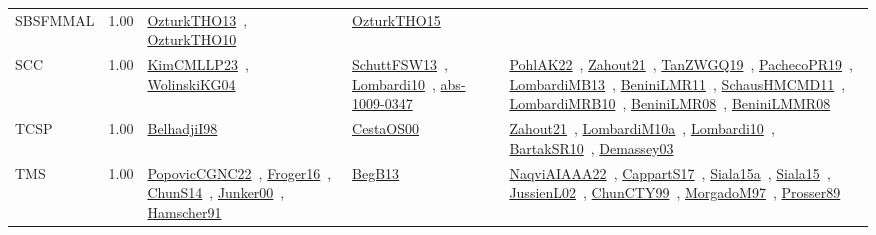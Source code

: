 {\begin{longtable}{p{3cm}r>{\raggedright\arraybackslash}p{6cm}>{\raggedright\arraybackslash}p{6cm}>{\raggedright\arraybackslash}p{8cm}}
\index{SBSFMMAL}\index{Classification!SBSFMMAL}SBSFMMAL &  1.00 & \href{../works/OzturkTHO13.pdf}{OzturkTHO13}~\cite{OzturkTHO13}, \href{../works/OzturkTHO10.pdf}{OzturkTHO10}~\cite{OzturkTHO10} & \href{../works/OzturkTHO15.pdf}{OzturkTHO15}~\cite{OzturkTHO15} & \\
\index{SCC}\index{Classification!SCC}SCC &  1.00 & \href{../works/KimCMLLP23.pdf}{KimCMLLP23}~\cite{KimCMLLP23}, \href{../works/WolinskiKG04.pdf}{WolinskiKG04}~\cite{WolinskiKG04} & \href{../works/SchuttFSW13.pdf}{SchuttFSW13}~\cite{SchuttFSW13}, \href{../works/Lombardi10.pdf}{Lombardi10}~\cite{Lombardi10}, \href{../works/abs-1009-0347.pdf}{abs-1009-0347}~\cite{abs-1009-0347} & \href{../works/PohlAK22.pdf}{PohlAK22}~\cite{PohlAK22}, \href{../works/Zahout21.pdf}{Zahout21}~\cite{Zahout21}, \href{../works/TanZWGQ19.pdf}{TanZWGQ19}~\cite{TanZWGQ19}, \href{../works/PachecoPR19.pdf}{PachecoPR19}~\cite{PachecoPR19}, \href{../works/LombardiMB13.pdf}{LombardiMB13}~\cite{LombardiMB13}, \href{../works/BeniniLMR11.pdf}{BeniniLMR11}~\cite{BeniniLMR11}, \href{../works/SchausHMCMD11.pdf}{SchausHMCMD11}~\cite{SchausHMCMD11}, \href{../works/LombardiMRB10.pdf}{LombardiMRB10}~\cite{LombardiMRB10}, \href{../works/BeniniLMR08.pdf}{BeniniLMR08}~\cite{BeniniLMR08}, \href{../works/BeniniLMMR08.pdf}{BeniniLMMR08}~\cite{BeniniLMMR08}\\
\index{TCSP}\index{Classification!TCSP}TCSP &  1.00 & \href{../works/BelhadjiI98.pdf}{BelhadjiI98}~\cite{BelhadjiI98} & \href{../works/CestaOS00.pdf}{CestaOS00}~\cite{CestaOS00} & \href{../works/Zahout21.pdf}{Zahout21}~\cite{Zahout21}, \href{../works/LombardiM10a.pdf}{LombardiM10a}~\cite{LombardiM10a}, \href{../works/Lombardi10.pdf}{Lombardi10}~\cite{Lombardi10}, \href{../works/BartakSR10.pdf}{BartakSR10}~\cite{BartakSR10}, \href{../works/Demassey03.pdf}{Demassey03}~\cite{Demassey03}\\
\index{TMS}\index{Classification!TMS}TMS &  1.00 & \href{../works/PopovicCGNC22.pdf}{PopovicCGNC22}~\cite{PopovicCGNC22}, \href{../works/Froger16.pdf}{Froger16}~\cite{Froger16}, \href{../works/ChunS14.pdf}{ChunS14}~\cite{ChunS14}, \href{../works/Junker00.pdf}{Junker00}~\cite{Junker00}, \href{../works/Hamscher91.pdf}{Hamscher91}~\cite{Hamscher91} & \href{../works/BegB13.pdf}{BegB13}~\cite{BegB13} & \href{../works/NaqviAIAAA22.pdf}{NaqviAIAAA22}~\cite{NaqviAIAAA22}, \href{../works/CappartS17.pdf}{CappartS17}~\cite{CappartS17}, \href{../works/Siala15a.pdf}{Siala15a}~\cite{Siala15a}, \href{../works/Siala15.pdf}{Siala15}~\cite{Siala15}, \href{../works/JussienL02.pdf}{JussienL02}~\cite{JussienL02}, \href{../works/ChunCTY99.pdf}{ChunCTY99}~\cite{ChunCTY99}, \href{../works/MorgadoM97.pdf}{MorgadoM97}~\cite{MorgadoM97}, \href{../works/Prosser89.pdf}{Prosser89}~\cite{Prosser89}\\

\end{longtable}}

